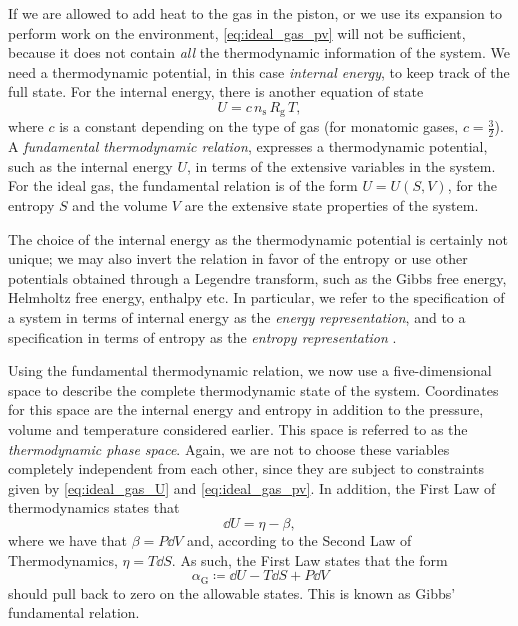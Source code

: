 If we are allowed to add heat to the gas in the piston, or we use its expansion to perform work on the environment, \cref{eq:ideal_gas_pv} will not be sufficient, because it does not contain \emph{all} the thermodynamic information of the system. We need a thermodynamic potential, in this case \emph{internal energy}, to keep track of the full state. For the internal energy, there is another equation of state \cite{Callen1985}
\begin{equation}
    U = c\, n_\text{s}\, R_\text{g}\, T,
    \label{eq:ideal_gas_U}
\end{equation}
where $c$ is a constant depending on the type of gas (for monatomic gases, $c = \tfrac{3}{2}$).
A \emph{fundamental thermodynamic relation}, expresses a thermodynamic potential, such as the internal energy $U$, in terms of the extensive variables in the system. For the ideal gas, the fundamental relation is of the form $U = U(S, V)$, for the entropy $S$ and the volume $V$ are the extensive state properties of the system. 

The choice of the internal energy as the thermodynamic potential is certainly not unique; we may also invert the relation in favor of the entropy or use other potentials obtained through a Legendre transform, such as the Gibbs free energy, Helmholtz free energy, enthalpy etc. In particular, we refer to the specification of a system in terms of internal energy as the \emph{energy representation}, and to a specification in terms of entropy as the \emph{entropy representation} \cite{VanderSchaft2021a}.

Using the fundamental thermodynamic relation, we now use a five-dimensional space to describe the complete thermodynamic state of the system. Coordinates for this space are the internal energy and entropy in addition to the pressure, volume and temperature considered earlier. This space is referred to as the \emph{thermodynamic phase space}. Again, we are not to choose these variables completely independent from each other, since they are subject to constraints given by \cref{eq:ideal_gas_U} and \cref{eq:ideal_gas_pv}. In addition, the First Law of thermodynamics states that
$$ \dd{U} = \eta - \beta, $$
where we have that $ \beta = P\dd{V} $ and, according to the Second Law of Thermodynamics, $\eta = T\dd{S}$. As such, the First Law states that the form
\begin{equation} 
    \alpha_\text{G} \coloneq \dd{U} - T\dd{S} + P\dd{V}
    \label{eq:gibbs_relation}
\end{equation}
should pull back to zero on the allowable states. This is known as Gibbs' fundamental relation. 

